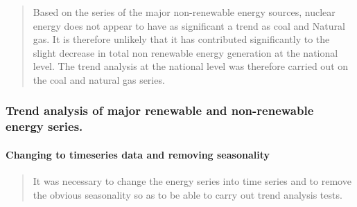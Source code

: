 \documentclass[12pt,]{article}
\let\oldparagraph\paragraph
\renewcommand{\paragraph}[1]{\oldparagraph{#1}\mbox{}}
\begin{document}
\begin{quote}
Based on the series of the major non-renewable energy sources, nuclear
energy does not appear to have as significant a trend as coal and
Natural gas. It is therefore unlikely that it has contributed
significantly to the slight decrease in total non renewable energy
generation at the national level. The trend analysis at the national
level was therefore carried out on the coal and natural gas series.
\end{quote}

\subsubsection{Trend analysis of major renewable and non-renewable
energy
series.}\label{trend-analysis-of-major-renewable-and-non-renewable-energy-series.}

\paragraph{Changing to timeseries data and removing
seasonality}\label{changing-to-timeseries-data-and-removing-seasonality}

\begin{quote}
It was necessary to change the energy series into time series and to
remove the obvious seasonality so as to be able to carry out trend
analysis tests.
\end{quote}
\end{document}
